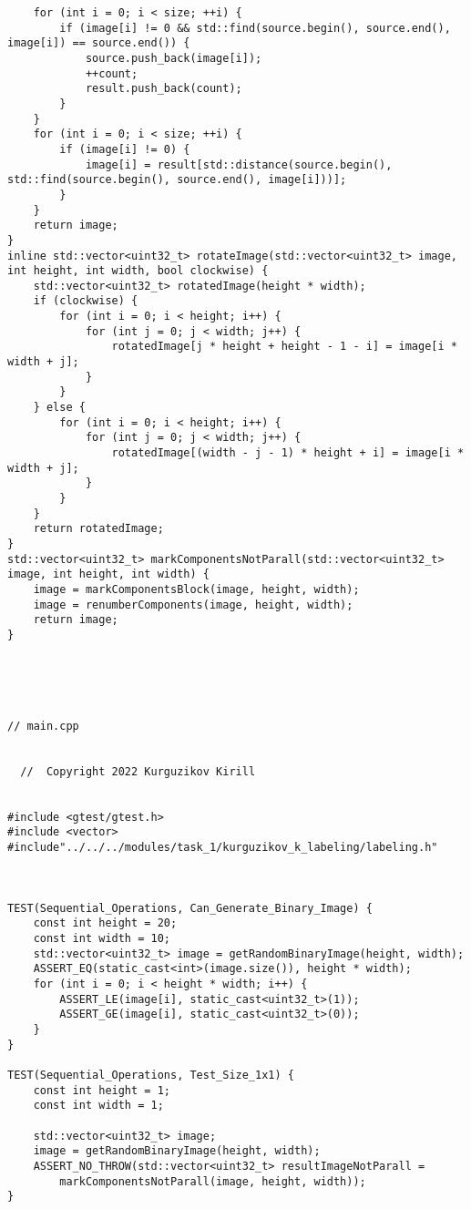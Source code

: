 \documentclass{report}
\begin{document}
\begin{lstlisting}
    for (int i = 0; i < size; ++i) {
        if (image[i] != 0 && std::find(source.begin(), source.end(), image[i]) == source.end()) {
            source.push_back(image[i]);
            ++count;
            result.push_back(count);
        }
    }
    for (int i = 0; i < size; ++i) {
        if (image[i] != 0) {
            image[i] = result[std::distance(source.begin(), std::find(source.begin(), source.end(), image[i]))];
        }
    }
    return image;
}
inline std::vector<uint32_t> rotateImage(std::vector<uint32_t> image, int height, int width, bool clockwise) {
    std::vector<uint32_t> rotatedImage(height * width);
    if (clockwise) {
        for (int i = 0; i < height; i++) {
            for (int j = 0; j < width; j++) {
                rotatedImage[j * height + height - 1 - i] = image[i * width + j];
            }
        }
    } else {
        for (int i = 0; i < height; i++) {
            for (int j = 0; j < width; j++) {
                rotatedImage[(width - j - 1) * height + i] = image[i * width + j];
            }
        }
    }
    return rotatedImage;
}
std::vector<uint32_t> markComponentsNotParall(std::vector<uint32_t> image, int height, int width) {
    image = markComponentsBlock(image, height, width);
    image = renumberComponents(image, height, width);
    return image;
}





// main.cpp


  //  Copyright 2022 Kurguzikov Kirill


#include <gtest/gtest.h>
#include <vector>
#include"../../../modules/task_1/kurguzikov_k_labeling/labeling.h"



TEST(Sequential_Operations, Can_Generate_Binary_Image) {
    const int height = 20;
    const int width = 10;
    std::vector<uint32_t> image = getRandomBinaryImage(height, width);
    ASSERT_EQ(static_cast<int>(image.size()), height * width);
    for (int i = 0; i < height * width; i++) {
        ASSERT_LE(image[i], static_cast<uint32_t>(1));
        ASSERT_GE(image[i], static_cast<uint32_t>(0));
    }
}

TEST(Sequential_Operations, Test_Size_1x1) {
    const int height = 1;
    const int width = 1;

    std::vector<uint32_t> image;
    image = getRandomBinaryImage(height, width);
    ASSERT_NO_THROW(std::vector<uint32_t> resultImageNotParall =
        markComponentsNotParall(image, height, width));
}


\end{lstlisting}
\end{document}
